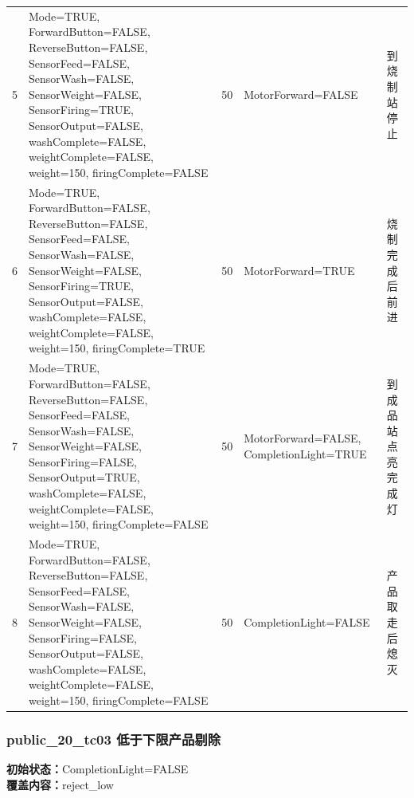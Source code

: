 \begin{longtable}{L{1.0cm}L{4.7cm}L{1.4cm}L{4.0cm}L{2.1cm}}
5 & Mode=TRUE, ForwardButton=FALSE, ReverseButton=FALSE, SensorFeed=FALSE, SensorWash=FALSE, SensorWeight=FALSE, SensorFiring=TRUE, SensorOutput=FALSE, washComplete=FALSE, weightComplete=FALSE, weight=150, firingComplete=FALSE & 50 & MotorForward=FALSE & 到烧制站停止\\

6 & Mode=TRUE, ForwardButton=FALSE, ReverseButton=FALSE, SensorFeed=FALSE, SensorWash=FALSE, SensorWeight=FALSE, SensorFiring=TRUE, SensorOutput=FALSE, washComplete=FALSE, weightComplete=FALSE, weight=150, firingComplete=TRUE & 50 & MotorForward=TRUE & 烧制完成后前进\\

7 & Mode=TRUE, ForwardButton=FALSE, ReverseButton=FALSE, SensorFeed=FALSE, SensorWash=FALSE, SensorWeight=FALSE, SensorFiring=FALSE, SensorOutput=TRUE, washComplete=FALSE, weightComplete=FALSE, weight=150, firingComplete=FALSE & 50 & MotorForward=FALSE, CompletionLight=TRUE & 到成品站点亮完成灯\\

8 & Mode=TRUE, ForwardButton=FALSE, ReverseButton=FALSE, SensorFeed=FALSE, SensorWash=FALSE, SensorWeight=FALSE, SensorFiring=FALSE, SensorOutput=FALSE, washComplete=FALSE, weightComplete=FALSE, weight=150, firingComplete=FALSE & 50 & CompletionLight=FALSE & 产品取走后熄灭\\

\bottomrule

\end{longtable}

\subsubsection{{\ttfamily public\_20\_tc03} 低于下限产品剔除}

\noindent\textbf{初始状态：}CompletionLight=FALSE\\

\textbf{覆盖内容：}reject\_low

